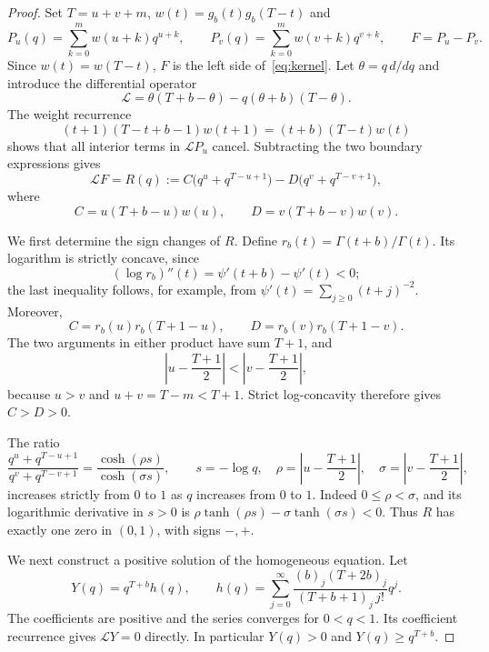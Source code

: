 \documentclass[11pt]{article}
\newcommand{\G}{\Gamma}
\begin{document}
\begin{proof}
Set $T=u+v+m$, $w(t)=g_b(t)g_b(T-t)$ and
\[
 P_u(q)=\sum_{k=0}^m w(u+k)q^{u+k},\qquad
 P_v(q)=\sum_{k=0}^m w(v+k)q^{v+k},\qquad
 F=P_u-P_v.
\]
Since $w(t)=w(T-t)$, $F$ is the left side of~\eqref{eq:kernel}.
Let $\theta=q\,d/dq$ and introduce the differential operator
\[
 \mathcal L=\theta(T+b-\theta)-q(\theta+b)(T-\theta).
\]
The weight recurrence
\begin{equation}
 (t+1)(T-t+b-1)w(t+1)=(t+b)(T-t)w(t)
 \label{eq:weights}
\end{equation}
shows that all interior terms in $\mathcal LP_u$ cancel.
Subtracting the two boundary expressions gives
\begin{equation}
 \mathcal LF=R(q):=
 C\bigl(q^u+q^{T-u+1}\bigr)
 -D\bigl(q^v+q^{T-v+1}\bigr),
 \label{eq:forcing}
\end{equation}
where
\[
 C=u(T+b-u)w(u),\qquad D=v(T+b-v)w(v).
\]

We first determine the sign changes of $R$. Define
$r_b(t)=\G(t+b)/\G(t)$. Its logarithm is strictly concave, since
\[
 (\log r_b)''(t)=\psi'(t+b)-\psi'(t)<0;
\]
the last inequality follows, for example, from
$\psi'(t)=\sum_{j\geq0}(t+j)^{-2}$.
Moreover,
\[
 C=r_b(u)r_b(T+1-u),\qquad
 D=r_b(v)r_b(T+1-v).
\]
The two arguments in either product have sum $T+1$, and
\[
 \left|u-\frac{T+1}{2}\right|
 <\left|v-\frac{T+1}{2}\right|,
\]
because $u>v$ and $u+v=T-m<T+1$.
Strict log-concavity therefore gives $C>D>0$.

The ratio
\[
 \frac{q^u+q^{T-u+1}}{q^v+q^{T-v+1}}
 =\frac{\cosh(\rho s)}{\cosh(\sigma s)},\qquad
 s=-\log q,\quad
 \rho=\left|u-\frac{T+1}{2}\right|,\quad
 \sigma=\left|v-\frac{T+1}{2}\right|,
\]
increases strictly from $0$ to $1$ as $q$ increases from $0$ to $1$.
Indeed $0\leq\rho<\sigma$, and its logarithmic derivative in $s>0$
is $\rho\tanh(\rho s)-\sigma\tanh(\sigma s)<0$.
Thus $R$ has exactly one zero in $(0,1)$, with signs $-,+$.

We next construct a positive solution of the homogeneous equation.
Let
\begin{equation}
 Y(q)=q^{T+b}h(q),\qquad
 h(q)=\sum_{j=0}^\infty
 \frac{(b)_j(T+2b)_j}{(T+b+1)_j\,j!}q^j .
 \label{eq:ground}
\end{equation}
The coefficients are positive and the series converges for $0<q<1$.
Its coefficient recurrence gives $\mathcal LY=0$ directly.
In particular $Y(q)>0$ and $Y(q)\geq q^{T+b}$.


\end{proof}
\end{document}
